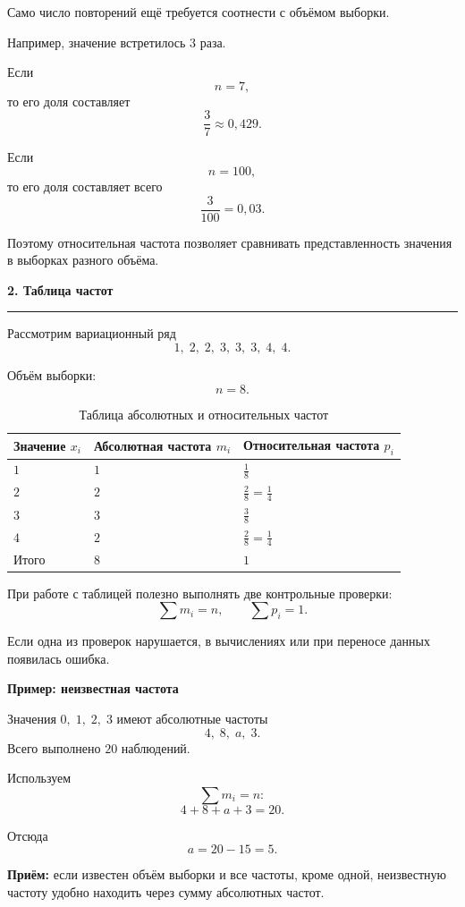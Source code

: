 \documentclass[a4paper,12pt]{article}
\newcommand{\sectiontitle}[1]{%
    \vspace{0.4em}
    {\Large\bfseries\color{darkaccent}#1\par}
    \vspace{0.25em}
    {\color{linegray}\rule{\linewidth}{0.6pt}}
    \vspace{0.7em}
}
\newcommand{\subsectiontitle}[1]{%
    \vspace{0.5em}
    {\large\bfseries\color{accent}#1\par}
    \vspace{0.25em}
}
\newcommand{\important}[1]{%
    {\color{darkaccent}\bfseries #1}
}
\begin{document}
Само число повторений ещё требуется соотнести с объёмом выборки.

Например, значение встретилось \(3\) раза.

Если
\[
n=7,
\]
то его доля составляет
\[
\frac{3}{7}\approx 0{,}429.
\]

Если
\[
n=100,
\]
то его доля составляет всего
\[
\frac{3}{100}=0{,}03.
\]

Поэтому относительная частота позволяет сравнивать представленность значения
в выборках разного объёма.


\sectiontitle{2. Таблица частот}

Рассмотрим вариационный ряд
\[
1,\;2,\;2,\;3,\;3,\;3,\;4,\;4.
\]

Объём выборки:
\[
n=8.
\]

\begin{table}[ht]
\centering
\caption{Таблица абсолютных и относительных частот}
\begin{tabularx}{0.88\linewidth}{>{\centering\arraybackslash}X
                                >{\centering\arraybackslash}X
                                >{\centering\arraybackslash}X}
\toprule
Значение \(x_i\) &
Абсолютная частота \(m_i\) &
Относительная частота \(p_i\) \\
\midrule
\(1\) & \(1\) & \(\frac18\) \\
\(2\) & \(2\) & \(\frac28=\frac14\) \\
\(3\) & \(3\) & \(\frac38\) \\
\(4\) & \(2\) & \(\frac28=\frac14\) \\
\midrule
Итого & \(8\) & \(1\) \\
\bottomrule
\end{tabularx}
\end{table}

При работе с таблицей полезно выполнять две контрольные проверки:
\[
\sum m_i=n,
\qquad
\sum p_i=1.
\]

Если одна из проверок нарушается, в вычислениях или при переносе данных
появилась ошибка.

\subsectiontitle{Пример: неизвестная частота}

Значения \(0,\;1,\;2,\;3\) имеют абсолютные частоты
\[
4,\;8,\;a,\;3.
\]
Всего выполнено \(20\) наблюдений.

Используем
\[
\sum m_i=n:
\]
\[
4+8+a+3=20.
\]

Отсюда
\[
a=20-15=5.
\]

\important{Приём:} если известен объём выборки и все частоты, кроме одной,
неизвестную частоту удобно находить через сумму абсолютных частот.
\end{document}
